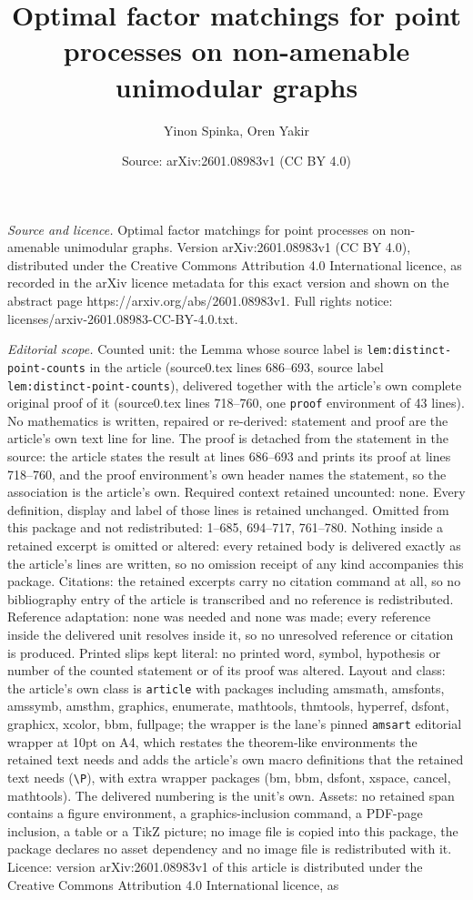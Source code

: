 \documentclass[10pt,a4paper]{amsart}
\title[Optimal factor matchings for point processes on non-amenable]{Optimal factor matchings for point processes on non-amenable unimodular graphs}
\author{Yinon Spinka, Oren Yakir}
\date{Source: arXiv:2601.08983v1 (CC BY 4.0)}
\begin{document}
\maketitle

\noindent\emph{Source and licence.} Optimal factor matchings for point processes on non-amenable unimodular graphs. Version arXiv:2601.08983v1 (CC BY 4.0), distributed under the Creative Commons Attribution 4.0 International licence, as recorded in the arXiv licence metadata for this exact version and shown on the abstract page https://arxiv.org/abs/2601.08983v1. Full rights notice: licenses/arxiv-2601.08983-CC-BY-4.0.txt.\par\smallskip

\noindent\textit{Editorial scope.} Counted unit: the Lemma whose source label is \texttt{lem:distinct-point-counts} in the article (source0.tex lines 686--693, source label \texttt{lem:distinct-point-counts}), delivered together with the article's own complete original proof of it (source0.tex lines 718--760, one \texttt{proof} environment of 43 lines). No mathematics is written, repaired or re-derived: statement and proof are the article's own text line for line. The proof is detached from the statement in the source: the article states the result at lines 686--693 and prints its proof at lines 718--760, and the proof environment's own header names the statement, so the association is the article's own. Required context retained uncounted: none. Every definition, display and label of those lines is retained unchanged. Omitted from this package and not redistributed: 1--685, 694--717, 761--780. Nothing inside a retained excerpt is omitted or altered: every retained body is delivered exactly as the article's lines are written, so no omission receipt of any kind accompanies this package. Citations: the retained excerpts carry no citation command at all, so no bibliography entry of the article is transcribed and no reference is redistributed. Reference adaptation: none was needed and none was made; every reference inside the delivered unit resolves inside it, so no unresolved reference or citation is produced. Printed slips kept literal: no printed word, symbol, hypothesis or number of the counted statement or of its proof was altered. Layout and class: the article's own class is \texttt{article} with packages including amsmath, amsfonts, amssymb, amsthm, graphics, enumerate, mathtools, thmtools, hyperref, dsfont, graphicx, xcolor, bbm, fullpage; the wrapper is the lane's pinned \texttt{amsart} editorial wrapper at 10pt on A4, which restates the theorem-like environments the retained text needs and adds the article's own macro definitions that the retained text needs (\texttt{\textbackslash P}), with extra wrapper packages (bm, bbm, dsfont, xspace, cancel, mathtools). The delivered numbering is the unit's own. Assets: no retained span contains a figure environment, a graphics-inclusion command, a PDF-page inclusion, a table or a TikZ picture; no image file is copied into this package, the package declares no asset dependency and no image file is redistributed with it. Licence: version arXiv:2601.08983v1 of this article is distributed under the Creative Commons Attribution 4.0 International licence, as 
\end{document}
